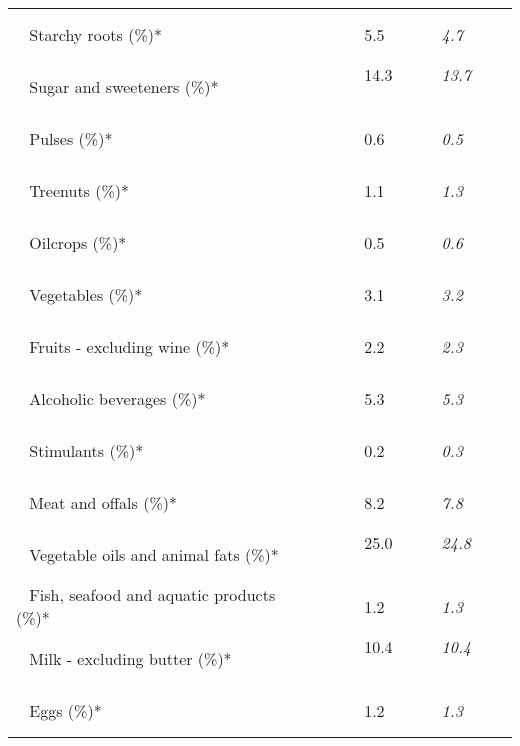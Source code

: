 \begin{tabular}{L{3.9cm} R{1cm} R{1cm} R{1cm}}
	 ~ Starchy roots (\%)* &  ~ \ \ & 5.5 ~ \ \ & \textit{4.7} ~ \ \ \\ 
	 ~ Sugar and sweeteners (\%)* &  ~ \ \ & 14.3 ~ \ \ & \textit{13.7} ~ \ \ \\ 
	 ~ Pulses (\%)* &  ~ \ \ & 0.6 ~ \ \ & \textit{0.5} ~ \ \ \\ 
	 ~ Treenuts (\%)* &  ~ \ \ & 1.1 ~ \ \ & \textit{1.3} ~ \ \ \\ 
	 ~ Oilcrops (\%)* &  ~ \ \ & 0.5 ~ \ \ & \textit{0.6} ~ \ \ \\ 
	 ~ Vegetables (\%)* &  ~ \ \ & 3.1 ~ \ \ & \textit{3.2} ~ \ \ \\ 
	 ~ Fruits - excluding wine (\%)* &  ~ \ \ & 2.2 ~ \ \ & \textit{2.3} ~ \ \ \\ 
	 ~ Alcoholic beverages (\%)* &  ~ \ \ & 5.3 ~ \ \ & \textit{5.3} ~ \ \ \\ 
	 ~ Stimulants (\%)* &  ~ \ \ & 0.2 ~ \ \ & \textit{0.3} ~ \ \ \\ 
	 ~ Meat and offals (\%)* &  ~ \ \ & 8.2 ~ \ \ & \textit{7.8} ~ \ \ \\ 
	 ~ Vegetable oils and animal fats (\%)* &  ~ \ \ & 25.0 ~ \ \ & \textit{24.8} ~ \ \ \\ 
	 ~ Fish, seafood and aquatic products (\%)* &  ~ \ \ & 1.2 ~ \ \ & \textit{1.3} ~ \ \ \\ 
	 ~ Milk - excluding butter (\%)* &  ~ \ \ & 10.4 ~ \ \ & \textit{10.4} ~ \ \ \\ 
	 ~ Eggs (\%)* &  ~ \ \ & 1.2 ~ \ \ & \textit{1.3} ~ \ \ \\ 
       \toprule
      \end{tabular}
      \clearpage
{}
